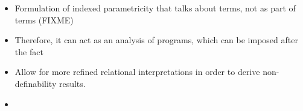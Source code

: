 \begin{itemize}
\item Formulation of indexed parametricity that talks about
  terms, not as part of terms (FIXME)
\item Therefore, it can act as an analysis of programs, which can be
  imposed after the fact
\item Allow for more refined relational interpretations in order to
  derive non-definability results.
\item 
\end{itemize}

